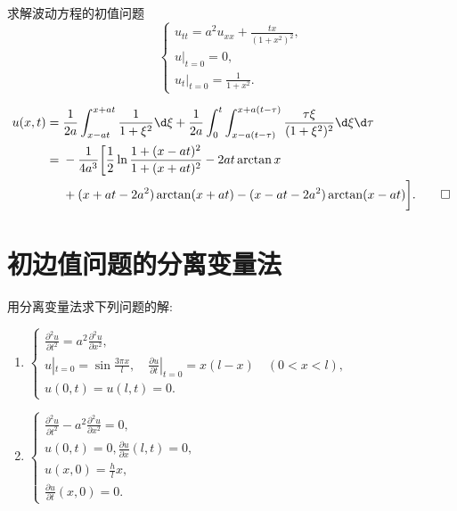 \begin{exercise}[9]
  求解波动方程的初值问题
  \[\begin{cases}
    u_{tt} = a^2u_{xx} + \frac{tx}{(1+x^2)^2}, \\
    u|_{t=0} = 0, \\
    u_t|_{t=0} = \frac{1}{1+x^2}.
  \end{cases}\]  
\end{exercise}


\begin{solve}
  \begin{align*}
    u(x,t)
    ={} & \frac{1}{2a}\int_{x-at}^{x+at}\frac{1}{1+\xi^2}\d\xi
      + \frac{1}{2a}\int_0^t\int_{x-a(t-\tau)}^{x+a(t-\tau)}
      \frac{\tau\xi}{(1+\xi^2)^2}\d\xi\d\tau \\
    ={} & -\frac{1}{4a^3}\bigg[\frac{1}{2}\ln\frac{1+(x-at)^2}{1+(x+at)^2}
          - 2at\arctan x \\
        & + (x+at-2a^2)\arctan (x+at) - (x-at-2a^2)\arctan (x-at)\bigg].\qedhere
  \end{align*}
\end{solve}


\section{初边值问题的分离变量法}

\begin{exercise}
  用分离变量法求下列问题的解:
  \begin{enumerate}[(1)]
    \item $\begin{cases}
      \frac{\partial^2u}{\partial t^2} = a^2 \frac{\partial^2u}{\partial x^2}, \\
      \displaystyle u|_{t=0} = \sin\frac{3\pi x}{l},\quad \frac{\partial u}{\partial t}|_{t=0} = x(l-x)\quad (0<x<l), \\
      u(0,t) = u(l,t) = 0.
    \end{cases}$
    \item $\begin{cases}
      \frac{\partial^2u}{\partial t^2} - a^2 \frac{\partial^2u}{\partial x^2} = 0, \\
      u(0,t) = 0, \frac{\partial u}{\partial x}(l,t)=0,\\
      u(x,0) = \frac{h}{l}x,\\
      \frac{\partial u}{\partial t}(x,0) = 0.  
    \end{cases}$
  \end{enumerate}
\end{exercise}

